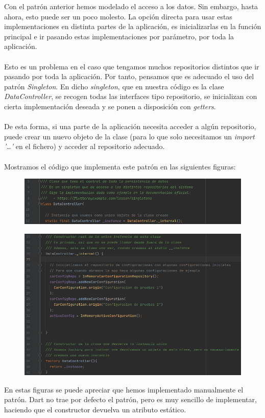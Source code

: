 Con el patrón anterior hemos modelado el acceso a los datos. Sin embargo, hasta ahora, esto puede ser un poco molesto. La opción directa para usar estas implementaciones en distinta partes de la aplicación, es inicializarlas en la función principal e ir pasando estas implementaciones por parámetro, por toda la aplicación.
\\\\
Esto es un problema en el caso que tengamos muchos repositorios distintos que ir pasando por toda la aplicación. Por tanto, pensamos que es adecuado el uso del patrón \emph{Singleton}. En dicho \emph{singleton}, que en nuestra código es la clase \emph{DataController}, se recogen todas las interfaces tipo repositorio, se inicializan con cierta implementación deseada y se ponen a disposición con \emph{getters}.
\\\\
De esta forma, si una parte de la aplicación necesita acceder a algún repositorio, puede crear un nuevo objeto de la clase (para lo que solo necesitamos un \emph{import '\ldots'} en el fichero) y acceder al repositorio adecuado.
\\\\
Mostramos el código que implementa este patrón en las siguientes figuras:

\begin{figure}[H]
    \centering
    \includegraphics[scale=0.6]{imagenes/ds-singleton1.png}
\end{figure}
\begin{figure}[H]
    \centering
    \includegraphics[scale=0.6]{imagenes/ds-singleton2.png}
\end{figure}

En estas figuras se puede apreciar que hemos implementado manualmente el patrón. Dart no trae por defecto el patrón, pero es muy sencillo de implementar, haciendo que el constructor devuelva un atributo estático.

\newpage




